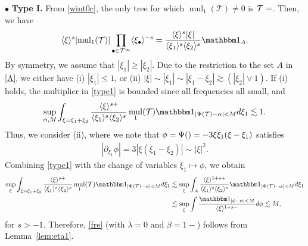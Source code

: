 \documentclass[a4paper,
11pt,  reqno]{amsart}
\makeatletter
\newcommand{\jap}[1]{\langle #1 \rangle}
\newcommand{\5}{\textup{V}}
\newcommand{\noi}{\noindent}
\newcommand{\ind}{\mathbbm 1}
\newcommand{\les}{\lesssim}
\theoremstyle{remark}
\newcommand{\bul}{\bullet}
\newcommand{\TT}{\mathcal{T}}
\newcommand{\al}{\alpha}
\newcommand{\ges}{\gtrsim}
\newcommand{\jb}[1]
{\langle #1 \rangle}
\DeclareMathOperator{\mul}{mul}
\def\<#1>{\csname MH@symb@#1\endcsname}
\numberwithin{equation}{section}
\numberwithin{theorem}{section}
\makeatother
\begin{document}
\smallskip
\noi
$\bul$ \textbf{Type I.}
From \eqref{wint0c}, the only tree for which $\mul_1(\TT)\neq 0$ is $\TT=\<1>$. Then, we have
\begin{align}\label{type1}
\jap{\xi}^s
| {\mul}_1(\TT) |
\prod_{\bul\in \TT^\infty} \jap{\xi_\bul}^{-s}
=
\frac{\jap{\xi}^s |\xi|}{\jap{\xi_1}^s \jap{\xi_2}^s} \ind_{A}.
\end{align}
By symmetry, we assume that $|\xi_1| \ge |\xi_2|$.
Due to the restriction to the set $A$ in \eqref{A}, we either have (i) $|\xi_1| \le 1$, or (ii) $|\xi| \sim |\xi_1| \sim | \xi_1 - \xi_2 | \ges (|\xi_2| \lor 1)$.
If (i) holds, the multiplier in \eqref{type1} is bounded since all frequencies all small, and
$$
\sup_{\al, M}
\int_{\xi=\xi_1+\xi_2}\frac{ \jb{\xi}^{s+ } }{\jb{\xi_1}^s \jb{\xi_2}^s } \mul_{1} (\TT) \ind_{|\Psi(\TT) - \al| < M }d\xi_1 \lesssim 1.
$$
Thus, we consider (ii), where we note that $\phi = \Psi(\<1>) = -3 \xi \xi_1(\xi-\xi_1)$ satisfies
\begin{align}
| \partial_{\xi_1} \phi | = 3 | \xi (\xi_1 - \xi_2)| \sim |\xi|^2.
\end{align}
Combining \eqref{type1} with the change of variables $\xi_1 \mapsto \phi $, we obtain
	\begin{align*}
    \sup_\xi
\int_{\xi=\xi_1+\xi_2}
\frac{ \jb{\xi}^{s+ } }{\jb{\xi_1}^s \jb{\xi_2}^s } \mul_{1} (\TT) \ind_{|\Psi(\TT) - \al| < M }d\xi_1
 &
\les
\sup_\xi
\int_{A} \frac{\jap{\xi}^{1 + s + }}{\jap{\xi_{1}}^{s}\jap{\xi_{2}}^{s}} \ind_{|\Psi(\TT) - \al| < M } d\xi_{1}
\\&\les
\sup_\xi
 \int \frac{\ind_{|\phi-\al| < M} }{ \jap{\xi}^{1 + s- }} d\phi \lesssim M,
	\end{align*}
	for $s>-1$. Therefore, \eqref{fre} (with $\lambda=0$ and $\beta=1-$) follows from Lemma~\ref{lem:eta1}.
\end{document}
